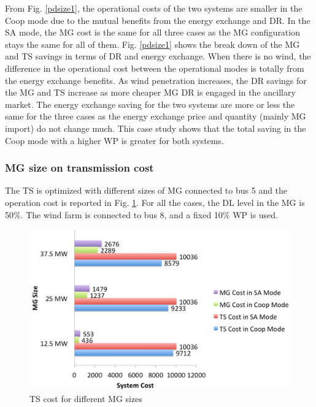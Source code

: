 From Fig. \ref{pdsize1},  the operational costs of the two systems are smaller in the Coop mode due to the mutual benefits from the energy exchange and DR.   In the SA mode, the MG cost is the same for all three cases as the MG configuration stays the same for all of them. Fig. \ref{pdsize1} shows the break down of the MG and TS savings in terms of DR and energy exchange. When there is no wind, the difference in the operational cost between the operational modes is totally from the energy exchange benefits. As wind penetration increases, the DR savings for the MG and TS increase as more cheaper MG DR is engaged in the ancillary market. The energy exchange saving for the two systems are more or less the same for the three cases as the energy exchange price and quantity (mainly MG import) do not change much. This case study shows that the total saving in the Coop mode with a higher WP is greater for both systems.

\subsubsection{MG size on transmission cost}
The TS is optimized with different sizes of MG connected to bus 5 and the operation cost is reported in Fig. \ref{mgsize}.  For all the cases, the DL level in the MG is 50\%. The wind farm is connected to bus 8, and a fixed 10\% WP is used. 

\begin{figure}[H]
\centering
\includegraphics[scale=0.25]{mgsize1.png}
\caption{TS cost for different MG sizes}
\label{mgsize}
\end{figure}

